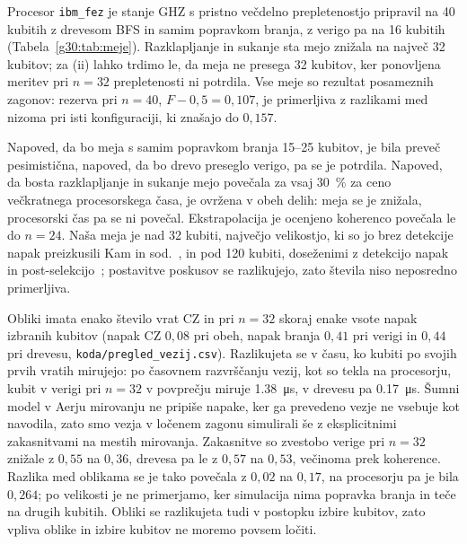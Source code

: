  Procesor \texttt{ibm\_fez} je stanje GHZ s pristno večdelno prepletenostjo pripravil na 40 kubitih z drevesom BFS in samim popravkom branja, z verigo pa na 16 kubitih (Tabela~\ref{g30:tab:meje}). Razklapljanje in sukanje sta mejo znižala na največ 32 kubitov; za (ii) lahko trdimo le, da meja ne presega 32 kubitov, ker ponovljena meritev pri $n = 32$ prepletenosti ni potrdila. Vse meje so rezultat posameznih zagonov: rezerva pri $n = 40$, $F - 0{,}5 = 0{,}107$, je primerljiva z razlikami med nizoma pri isti konfiguraciji, ki znašajo do $0{,}157$.

 Napoved, da bo meja s samim popravkom branja 15--25 kubitov, je bila preveč pesimistična, napoved, da bo drevo preseglo verigo, pa se je potrdila. Napoved, da bosta razklapljanje in sukanje mejo povečala za vsaj \SI{30}{\percent} za ceno večkratnega procesorskega časa, je ovržena v obeh delih: meja se je znižala, procesorski čas pa se ni povečal. Ekstrapolacija je ocenjeno koherenco povečala le do $n = 24$. Naša meja je nad 32 kubiti, največjo velikostjo, ki so jo brez detekcije napak preizkusili Kam in sod.~\cite{g30:kam2024}, in pod 120 kubiti, doseženimi z detekcijo napak in post-selekcijo~\cite{g30:bigcats2025}; postavitve poskusov se razlikujejo, zato števila niso neposredno primerljiva.

 Obliki imata enako število vrat CZ in pri $n = 32$ skoraj enake vsote napak izbranih kubitov (napak CZ $0{,}08$ pri obeh, napak branja $0{,}41$ pri verigi in $0{,}44$ pri drevesu, \texttt{koda/pregled\_vezij.csv}). Razlikujeta se v času, ko kubiti po svojih prvih vratih mirujejo: po časovnem razvrščanju vezij, kot so tekla na procesorju, kubit v verigi pri $n = 32$ v povprečju miruje \SI{1,38}{\micro\second}, v drevesu pa \SI{0,17}{\micro\second}. Šumni model v Aerju mirovanju ne pripiše napake, ker ga prevedeno vezje ne vsebuje kot navodila, zato smo vezja v ločenem zagonu simulirali še z eksplicitnimi zakasnitvami na mestih mirovanja. Zakasnitve so zvestobo verige pri $n = 32$ znižale z $0{,}55$ na $0{,}36$, drevesa pa le z $0{,}57$ na $0{,}53$, večinoma prek koherence. Razlika med oblikama se je tako povečala z $0{,}02$ na $0{,}17$, na procesorju pa je bila $0{,}264$; po velikosti je ne primerjamo, ker simulacija nima popravka branja in teče na drugih kubitih. Obliki se razlikujeta tudi v postopku izbire kubitov, zato vpliva oblike in izbire kubitov ne moremo povsem ločiti.

